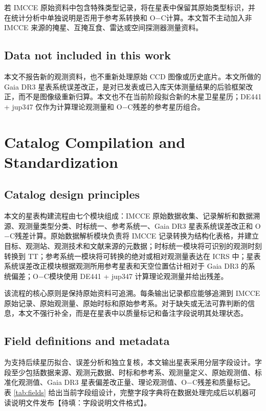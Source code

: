\documentclass{aastex701}
\newcommand{\oc}{O$-$C}
\begin{document}
若 IMCCE 原始资料中包含特殊类型记录，将在星表中保留其原始类型标识，并在统计分析中单独说明是否用于参考系转换和 \oc 计算。本文暂不主动加入非 IMCCE 来源的掩星、互掩互食、雷达或空间探测器测量资料。

\subsection{Data not included in this work} \label{subsec:not_included}

本文不报告新的观测资料，也不重新处理原始 CCD 图像或历史底片。本文所做的 Gaia DR3 星表系统误差改正，是对已发表或已入库天体测量结果的后验框架改正，而不是图像级重新归算。本文也不在当前阶段拟合新的木星卫星星历；DE441 + jup347 仅作为计算理论观测量和 \oc 残差的参考星历组合。

\section{Catalog Compilation and Standardization} \label{sec:compilation}

\subsection{Catalog design principles} \label{subsec:workflow}

本文的星表构建流程由七个模块组成：IMCCE 原始数据收集、记录解析和数据溯源、观测量类型分类、时标统一、参考系统一、Gaia DR3 星表系统误差改正和 \oc 残差计算。原始数据解析模块负责将 IMCCE 记录转换为结构化表格，并建立目标、观测站、观测技术和文献来源的元数据；时标统一模块将可识别的观测时刻转换到 TT；参考系统一模块将可转换的绝对或相对观测量表达在 ICRS 中；星表系统误差改正模块根据观测所用参考星表和天空位置估计相对于 Gaia DR3 的系统偏差；\oc 模块使用 DE441 + jup347 计算理论观测量并给出残差。

该流程的核心原则是保持原始资料可追溯。每条输出记录都应能够追溯到 IMCCE 原始记录、原始观测量、原始时标和原始参考系。对于缺失或无法可靠判断的信息，本文不强行补全，而是在星表中以质量标记和备注字段说明其处理状态。

\subsection{Field definitions and metadata} \label{subsec:field_definitions}

为支持后续星历拟合、误差分析和独立复核，本文输出星表采用分层字段设计。字段至少包括数据来源、观测元数据、时标和参考系、观测量定义、原始观测值、标准化观测值、Gaia DR3 星表偏差改正量、理论观测值、\oc 残差和质量标记。表 \ref{tab:fields} 给出当前字段组设计，完整字段字典将在数据处理完成后以机器可读说明文件发布【待填：字段说明文件格式】。
\end{document}
